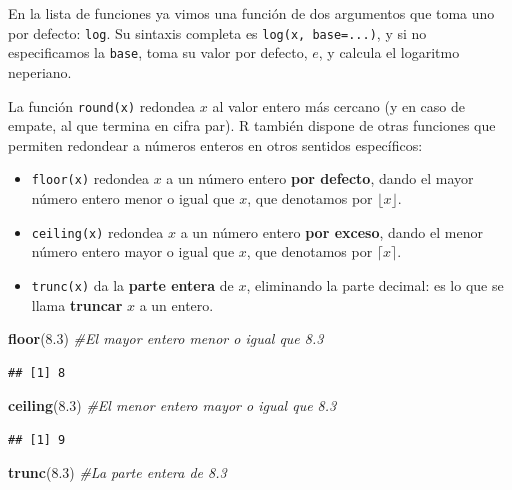 \documentclass[]{book}
\newenvironment{Shaded}{\begin{snugshade}}{\end{snugshade}}
\newcommand{\CommentTok}[1]{\textcolor[rgb]{0.56,0.35,0.01}{\textit{#1}}}
\newcommand{\FloatTok}[1]{\textcolor[rgb]{0.00,0.00,0.81}{#1}}
\newcommand{\KeywordTok}[1]{\textcolor[rgb]{0.13,0.29,0.53}{\textbf{#1}}}
\newcommand{\NormalTok}[1]{#1}
\theoremstyle{definition}
\theoremstyle{definition}
\theoremstyle{definition}
\theoremstyle{remark}
\begin{document}
En la lista de funciones ya vimos una función de dos argumentos que toma uno por defecto: \texttt{log}. Su sintaxis completa es \texttt{log(x,\ base=...)}, y si no especificamos la \texttt{base}, toma su valor por defecto, \(e\), y calcula el logaritmo neperiano.

La función \texttt{round(x)} redondea \(x\) al valor entero más cercano (y en caso de empate, al que termina en cifra par). R también dispone de otras funciones que permiten redondear a números enteros en otros sentidos específicos:

\begin{itemize}
\item
  \texttt{floor(x)} redondea \(x\) a un número entero \textbf{por defecto}, dando el mayor número entero menor o igual que \(x\), que denotamos por \(\lfloor x\rfloor\).
\item
  \texttt{ceiling(x)} redondea \(x\) a un número entero \textbf{por exceso}, dando el menor número entero mayor o igual que \(x\), que denotamos por \(\lceil x\rceil\).
\item
  \texttt{trunc(x)} da la \textbf{parte entera} de \(x\), eliminando la parte decimal: es lo que se llama \textbf{truncar} \(x\) a un entero.
\end{itemize}

\begin{Shaded}
\begin{Highlighting}[]
\KeywordTok{floor}\NormalTok{(}\FloatTok{8.3}\NormalTok{) }\CommentTok{#El mayor entero menor o igual que 8.3}
\end{Highlighting}
\end{Shaded}

\begin{verbatim}
## [1] 8
\end{verbatim}

\begin{Shaded}
\begin{Highlighting}[]
\KeywordTok{ceiling}\NormalTok{(}\FloatTok{8.3}\NormalTok{) }\CommentTok{#El menor entero mayor o igual que 8.3}
\end{Highlighting}
\end{Shaded}

\begin{verbatim}
## [1] 9
\end{verbatim}

\begin{Shaded}
\begin{Highlighting}[]
\KeywordTok{trunc}\NormalTok{(}\FloatTok{8.3}\NormalTok{) }\CommentTok{#La parte entera de 8.3}
\end{Highlighting}
\end{Shaded}
\end{document}
